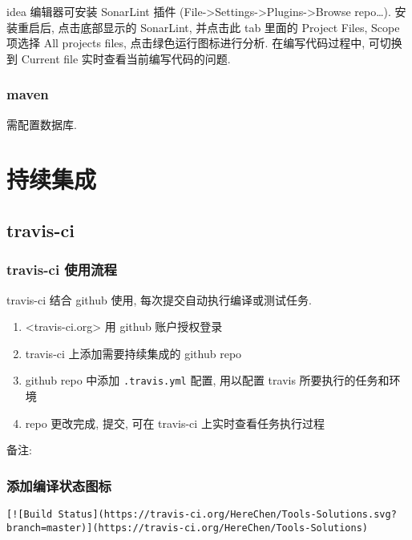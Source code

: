 idea 编辑器可安装 SonarLint 插件
(File-\textgreater{}Settings-\textgreater{}Plugins-\textgreater{}Browse
repo\ldots{}). 安装重启后, 点击底部显示的 SonarLint, 并点击此 tab 里面的
Project Files, Scope 项选择 All projects files,
点击绿色运行图标进行分析. 在编写代码过程中, 可切换到 Current file
实时查看当前编写代码的问题.

\subsubsection{maven}\label{maven-2}

需配置数据库.

\section{持续集成}\label{ux6301ux7eedux96c6ux6210}

\subsection{travis-ci}\label{travis-ci}

\subsubsection{travis-ci
使用流程}\label{travis-ci-ux4f7fux7528ux6d41ux7a0b}

travis-ci 结合 github 使用, 每次提交自动执行编译或测试任务.

\begin{enumerate}
\def\labelenumi{\arabic{enumi}.}
\tightlist
\item
  \textless{}travis-ci.org\textgreater{} 用 github 账户授权登录
\item
  travis-ci 上添加需要持续集成的 github repo
\item
  github repo 中添加 \lstinline!.travis.yml! 配置, 用以配置 travis
  所要执行的任务和环境
\item
  repo 更改完成, 提交, 可在 travis-ci 上实时查看任务执行过程
\end{enumerate}

备注:

\subsubsection{添加编译状态图标}\label{ux6dfbux52a0ux7f16ux8bd1ux72b6ux6001ux56feux6807}

\begin{lstlisting}
[![Build Status](https://travis-ci.org/HereChen/Tools-Solutions.svg?branch=master)](https://travis-ci.org/HereChen/Tools-Solutions)
\end{lstlisting}


